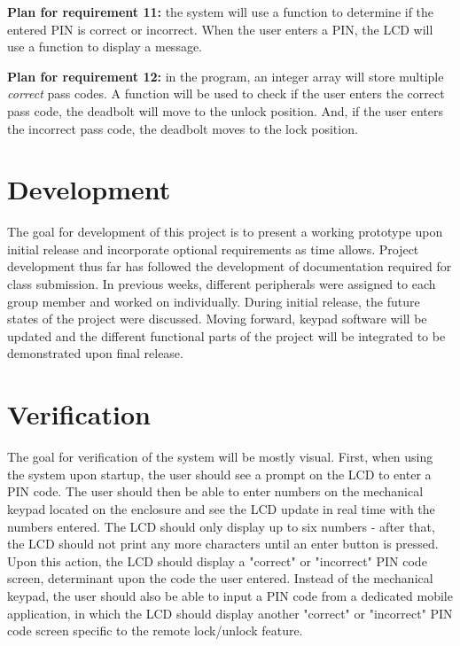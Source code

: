 \textbf{Plan for requirement 11:} the system will use a function to determine if the entered PIN is correct or incorrect. When the user enters a PIN, the LCD will use a function to display a message. 

\textbf{Plan for requirement 12:} in the program, an integer array will store multiple \textit{correct} pass codes. A function will be used to check if the user enters the correct pass code, the deadbolt will move to the unlock position. And, if the user enters the incorrect pass code, the deadbolt moves to the lock position. 

\section{Development}
The goal for development of this project is to present a working prototype upon initial release and incorporate optional requirements as time allows. Project development thus far has followed the development of documentation required for class submission. In previous weeks, different peripherals were assigned to each group member and worked on individually. During initial release, the future states of the project were discussed. Moving forward, keypad software will be updated and the different functional parts of the project will be integrated to be demonstrated upon final release.

\section{Verification}
The goal for verification of the system will be mostly visual. First, when using the system upon startup, the user should see a prompt on the LCD to enter a PIN code. The user should then be able to enter numbers on the mechanical keypad located on the enclosure and see the LCD update in real time with the numbers entered. The LCD should only display up to six numbers - after that, the LCD should not print any more characters until an enter button is pressed. Upon this action, the LCD should display a "correct" or "incorrect" PIN code screen, determinant upon the code the user entered. Instead of the mechanical keypad, the user should also be able to input a PIN code from a dedicated mobile application, in which the LCD should display another "correct" or "incorrect" PIN code screen specific to the remote lock/unlock feature.

